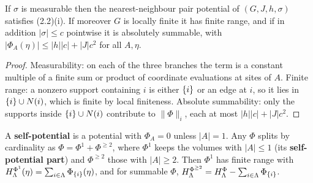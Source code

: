\begin{lemma}
    \label{lem:pot-nearest-neighbour-summable}
    \leanok

    If $\sigma$ is measurable then the nearest-neighbour pair potential of $(G, J, h, \sigma)$
    satisfies (2.2)(i). If moreover $G$ is locally finite it has finite range, and if in
    addition $|\sigma| \leq c$ pointwise it is absolutely summable, with
    $|\Phi_A(\eta)| \leq |h||c| + |J| c^2$ for all $A, \eta$.
\end{lemma}
\begin{proof}
    \leanok

    Measurability: on each of the three branches the term is a constant multiple of a finite
    sum or product of coordinate evaluations at sites of $A$. Finite range: a nonzero support
    containing $i$ is either $\left\{ i \right\}$ or an edge at $i$, so it lies in
    $\left\{ i \right\} \cup N(i)$, which is finite by local finiteness. Absolute summability: only the
    supports inside $\left\{ i \right\} \cup N(i)$ contribute to $\|\Phi\|_i$, each at most
    $|h||c| + |J|c^2$.
\end{proof}

\begin{definition}
    \label{def:pot-self-potential}
    \leanok

    A \textbf{self-potential} is a potential with $\Phi_A = 0$ unless $|A| = 1$. Any $\Phi$
    splits by cardinality as $\Phi = \Phi^{1} + \Phi^{\geq 2}$, where $\Phi^{1}$ keeps the
    volumes with $|A| \leq 1$ (its \textbf{self-potential part}) and $\Phi^{\geq 2}$ those with
    $|A| \geq 2$. Then $\Phi^{1}$ has finite range with
    $H^{\Phi^{1}}_\Lambda(\eta) = \sum_{i \in \Lambda} \Phi_{\left\{ i \right\}}(\eta)$, and for summable
    $\Phi$, $H^{\Phi^{\geq 2}}_\Lambda = H^\Phi_\Lambda - \sum_{i \in \Lambda}
    \Phi_{\left\{ i \right\}}$.
\end{definition}

